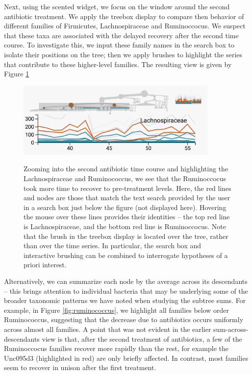 \documentclass{report}
\begin{document}
Next, using the scented widget, we focus on the window around the second
antibiotic treatment. We apply the treebox display to compare then behavior of
different families of Firmicutes, Lachnospiraceae and Ruminoccocus. We suspect
that these taxa are associated with the delayed recovery after the second time
course. To investigate this, we input these family names in the search box to
isolate their positions on the tree; then we apply brushes to highlight the
series that contribute to these higher-level families. The resulting view is
given by Figure \ref{fig:antibioticfirmicutes}

\begin{figure}
{\centering \includegraphics[width=375px]{figure/treelapse/antibiotic_firmicutes}}
\caption{Zooming into the second antibiotic time course and highlighting the
  Lachnospiraceae and Ruminococcus, we see that the Ruminoccocus took more time
  to recover to pre-treatment levels. Here, the red lines and nodes are those
  that match the text search provided by the user in a search box just below the
  figure (not displayed here). Hovering the mouse over these lines provides
  their identities -- the top red line is Lachnospiraceae, and the bottom red
  line is Ruminoccocus. Note that the brush in the treebox display is located
  over the tree, rather than over the time series. In particular, the search box
  and interactive brushing can be combined to interrogate hypotheses of a priori
  interest. \label{fig:antibioticfirmicutes}}
\end{figure}

Alternatively, we can summarize each node by the average across its descendants
-- this brings attention to individual bacteria that may be underlying some of
the broader taxonomic patterns we have noted when studying the subtree sums. For
example, in Figure \ref{fig:ruminococcus}, we highlight all families below order
Ruminococcus, suggesting that the decrease due to antibiotics occurs uniformly
across almost all families. A point that was not evident in the earlier
sum-across-descendants view is that, after the second treatment of antibiotics,
a few of the Ruminoccocus families recover more rapidly than the rest, for
example the Unc095d3 (highlighted in red) are only briefly affected. In
contrast, most families seem to recover in unison after the first treatment.
\end{document}
